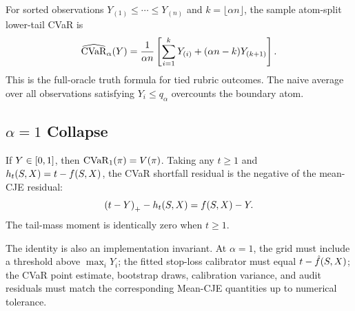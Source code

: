 For sorted observations $Y_{(1)}\le\cdots\le Y_{(n)}$ and
$k=\lfloor \alpha n\rfloor$, the sample atom-split lower-tail CVaR is
\begin{equation}
\widehat{\mathrm{CVaR}}_\alpha(Y)
=\frac{1}{\alpha n}\left[
\sum_{i=1}^{k}Y_{(i)}+(\alpha n-k)Y_{(k+1)}
\right].
\label{eq:atom-sample}
\end{equation}
This is the full-oracle truth formula for tied rubric outcomes. The naive
average over all observations satisfying $Y_i\le q_\alpha$ overcounts the
boundary atom.

\subsection{\texorpdfstring{$\alpha=1$}{alpha=1} Collapse}
\label{app:alpha-one}

\begin{theorem}[$\alpha=1$ collapses to Mean-CJE]
\label{prop:formal-alpha-one}
If $Y\in[0,1]$, then $\mathrm{CVaR}_1(\pi)=V(\pi)$. Taking any
$t\ge1$ and $h_t(S,X)=t-f(S,X)$, the CVaR shortfall residual
is the negative of the mean-CJE residual:
\[
\left(t-Y\right)_{+}-h_t(S,X)
=f(S,X)-Y.
\]
The tail-mass moment is identically zero when $t\ge1$.
\end{theorem}

\begin{twocolproof}
\end{twocolproof}

The identity is also an implementation invariant. At $\alpha=1$, the grid must
include a threshold above $\max_iY_i$; the fitted stop-loss calibrator must
equal $t-\hat f(S,X)$; the CVaR point estimate, bootstrap draws,
calibration variance, and audit residuals must match the corresponding
Mean-CJE quantities up to numerical tolerance.
